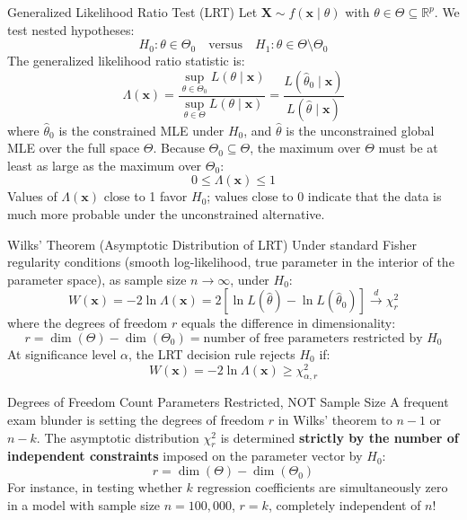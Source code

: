 \begin{definitionbox}{Generalized Likelihood Ratio Test (LRT)}
Let $\mathbf{X} \sim f(\mathbf{x} \mid \theta)$ with $\theta \in \Theta \subseteq \mathbb{R}^p$. We test nested hypotheses:
$$H_0 \colon \theta \in \Theta_0 \quad \text{versus} \quad H_1 \colon \theta \in \Theta \setminus \Theta_0$$
The generalized likelihood ratio statistic is:
$$\Lambda(\mathbf{x}) = \frac{\sup_{\theta \in \Theta_0} L(\theta \mid \mathbf{x})}{\sup_{\theta \in \Theta} L(\theta \mid \mathbf{x})} = \frac{L(\hat{\theta}_0 \mid \mathbf{x})}{L(\hat{\theta} \mid \mathbf{x})}$$
where $\hat{\theta}_0$ is the constrained MLE under $H_0$, and $\hat{\theta}$ is the unconstrained global MLE over the full space $\Theta$.
Because $\Theta_0 \subseteq \Theta$, the maximum over $\Theta$ must be at least as large as the maximum over $\Theta_0$:
$$0 \le \Lambda(\mathbf{x}) \le 1$$
Values of $\Lambda(\mathbf{x})$ close to 1 favor $H_0$; values close to 0 indicate that the data is much more probable under the unconstrained alternative.
\end{definitionbox}

\begin{formulabox}{Wilks' Theorem (Asymptotic Distribution of LRT)}
Under standard Fisher regularity conditions (smooth log-likelihood, true parameter in the interior of the parameter space), as sample size $n \to \infty$, under $H_0$:
$$W(\mathbf{x}) = -2 \ln \Lambda(\mathbf{x}) = 2 \left[\ln L(\hat{\theta}) - \ln L(\hat{\theta}_0)\right] \xrightarrow{d} \chi_r^2$$
where the degrees of freedom $r$ equals the difference in dimensionality:
$$r = \dim(\Theta) - \dim(\Theta_0) = \text{number of free parameters restricted by } H_0$$
At significance level $\alpha$, the LRT decision rule rejects $H_0$ if:
$$W(\mathbf{x}) = -2 \ln \Lambda(\mathbf{x}) \ge \chi_{\alpha, r}^2$$
\end{formulabox}

\begin{trapbox}{Degrees of Freedom Count Parameters Restricted, NOT Sample Size}
A frequent exam blunder is setting the degrees of freedom $r$ in Wilks' theorem to $n-1$ or $n-k$. The asymptotic distribution $\chi_r^2$ is determined \textbf{strictly by the number of independent constraints} imposed on the parameter vector by $H_0$:
$$r = \dim(\Theta) - \dim(\Theta_0)$$
For instance, in testing whether $k$ regression coefficients are simultaneously zero in a model with sample size $n = 100{,}000$, $r = k$, completely independent of $n$!
\end{trapbox}

